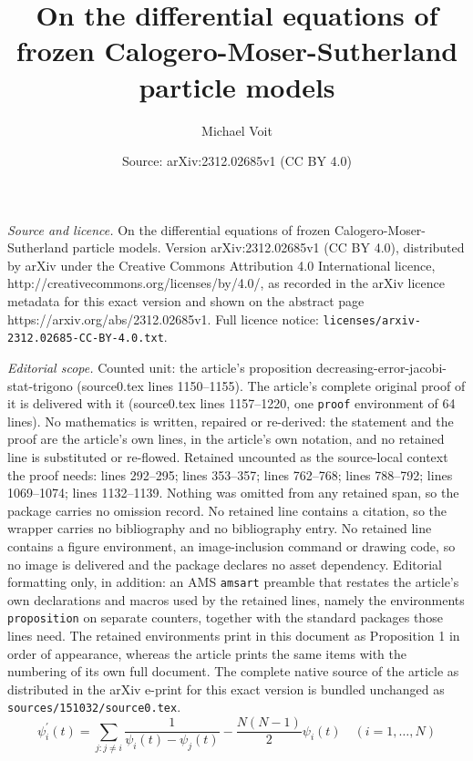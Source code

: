 \documentclass[10pt,a4paper]{amsart}
\title{On the differential equations of frozen Calogero-Moser-Sutherland particle models}
\author{Michael Voit}
\date{Source: arXiv:2312.02685v1 (CC BY 4.0)}
\begin{document}
\maketitle

\noindent\emph{Source and licence.} On the differential equations of frozen Calogero-Moser-Sutherland particle models. Version arXiv:2312.02685v1 (CC BY 4.0), distributed by arXiv under the Creative Commons Attribution 4.0 International licence, http://creativecommons.org/licenses/by/4.0/, as recorded in the arXiv licence metadata for this exact version and shown on the abstract page https://arxiv.org/abs/2312.02685v1. Full licence notice: \texttt{licenses/arxiv-2312.02685-CC-BY-4.0.txt}.\par\smallskip

\noindent\textit{Editorial scope.} Counted unit: the article's proposition decreasing-error-jacobi-stat-trigono (source0.tex lines 1150--1155). The article's complete original proof of it is delivered with it (source0.tex lines 1157--1220, one \texttt{proof} environment of 64 lines). No mathematics is written, repaired or re-derived: the statement and the proof are the article's own lines, in the article's own notation, and no retained line is substituted or re-flowed.  Retained uncounted as the source-local context the proof needs: lines 292--295; lines 353--357; lines 762--768; lines 788--792; lines 1069--1074; lines 1132--1139.  Nothing was omitted from any retained span, so the package carries no omission record.  No retained line contains a citation, so the wrapper carries no bibliography and no bibliography entry.  No retained line contains a figure environment, an image-inclusion command or drawing code, so no image is delivered and the package declares no asset dependency.  Editorial formatting only, in addition: an AMS \texttt{amsart} preamble that restates the article's own declarations and macros used by the retained lines, namely the environments \texttt{proposition} on separate counters, together with the standard packages those lines need.  The retained environments print in this document as Proposition 1 in order of appearance, whereas the article prints the same items with the numbering of its own full document.  The complete native source of the article as distributed in the arXiv e-print for this exact version is bundled unchanged as \texttt{sources/151032/source0.tex}.
\begin{equation}\label{ODE-tilde-a}
{\psi}_i^\prime(t) = \sum_{j: j\ne i}  \frac{1}{\psi_{i}(t)-\psi_{j}(t)}
-\frac{ N(N-1)}{2} \psi_{i}(t)\quad(i=1,\ldots,N)
\end{equation}
\end{document}
